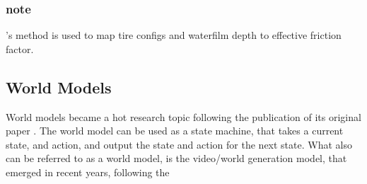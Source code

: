 \subsubsection{note}\cite{zhao_tire-pavement_2024}'s method is used to map tire configs and waterfilm depth to effective friction factor.


\subsection{World Models} World models became a hot research topic following the publication of its original paper \cite{ha2018worldmodels}. The world model can be used as a state machine, that takes a current state, and action, and output the state and action for the next state. What also can be referred to as a world model, is the video/world generation model, that emerged in recent years, following the 

